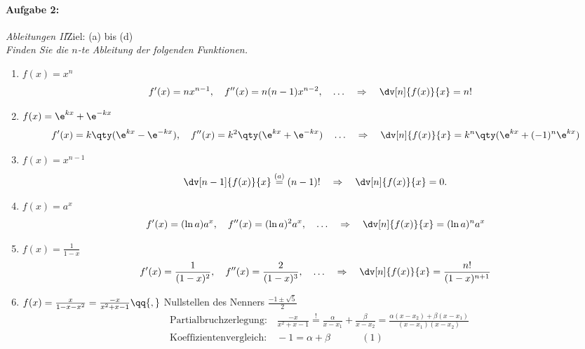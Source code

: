 \paragraph{Aufgabe 2: } \emph{Ableitungen II}\hfill Ziel: (a) bis (d)\\[0.2cm]
\emph{Finden Sie die $n$-te Ableitung der folgenden Funktionen.}
    \begin{enumerate}[label=(\alph*)]
        \setlength{\mathindent}{0cm}
        \item $f(x)=x^n$ 
        \begin{align}
            f'(x) &= n x^{n-1}, \quad f''(x) = n(n-1) x^{n-2}, \quad \hdots \quad \Rightarrow \quad \dv[n]{f(x)}{x} = n!
        \end{align}
        \item $f(x)=\e^{kx}+\e^{-kx}$
        \begin{align}
            f'(x) = k\qty(\e^{kx}-\e^{-kx}), \quad f''(x) = k^2 \qty(\e^{kx}+\e^{-kx})\quad \hdots \quad \Rightarrow \quad \dv[n]{f(x)}{x} = k^n \qty(\e^{kx} + (-1)^n \e^{kx})
        \end{align}
        \item $f(x)=x^{n-1}$
        \begin{align}
            \dv[n-1]{f(x)}{x} \overset{(a)}{=} (n-1)! \quad \Rightarrow \quad \dv[n]{f(x)}{x} = 0.
        \end{align}
        \item $f(x)=a^x$ 
        \begin{align}
            f'(x) = (\ln a) a^x, \quad f''(x) = (\ln a)^2 a^x, \quad \hdots \quad \Rightarrow \quad \dv[n]{f(x)}{x} = (\ln a)^n a^x
        \end{align}
        \item $f(x)=\frac{1}{1-x}$
        \begin{align}
            f'(x) = \frac{1}{(1-x)^2}, \quad f''(x) = \frac{2}{(1-x)^3}, \quad \hdots \quad \Rightarrow \quad \dv[n]{f(x)}{x} = \frac{n!}{(1-x)^{n+1}}
        \end{align}
        \item $f(x)=\frac{x}{1-x-x^2} = \frac{-x}{x^2+x-1}\qq{,} $ Nullstellen des Nenners $\frac{-1\pm\sqrt{5}}{2}$  
        \begin{align}
            &\text{Partialbruchzerlegung:}\quad \frac{-x}{x^2+x-1} \overset{!}{=} \frac{\alpha}{x-x_1} + \frac{\beta}{x-x_2} = \frac{\alpha (x-x_2)+\beta (x-x_1)}{(x-x_1)(x-x_2)} \\[3mm]
            &\text{Koeffizientenvergleich:}\quad -1 = \alpha + \beta \qquad\quad\, (1) \\

\end{align}
\end{enumerate}
